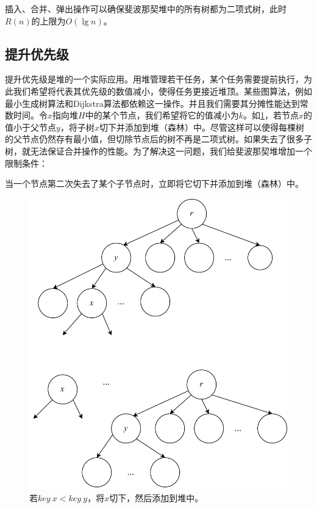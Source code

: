 \documentclass[b5paper]{ctexart}
\begin{document}
插入、合并、弹出操作可以确保斐波那契堆中的所有树都为二项式树，此时$R(n)$的上限为$O(\lg n)$。

\subsection{提升优先级}

提升优先级是堆的一个实际应用。用堆管理若干任务，某个任务需要提前执行，为此我们希望将代表其优先级的数值减小，使得任务更接近堆顶。某些图算法，例如最小生成树算法和Dijkstra算法都依赖这一操作\cite{CLRS}。并且我们需要其分摊性能达到常数时间。令$x$指向堆$H$中的某个节点，我们希望将它的值减小为$k$。如\cref{fig:cut-fib-tree}，若节点$x$的值小于父节点$y$，将子树$x$切下并添加到堆（森林）中。尽管这样可以使得每棵树的父节点仍然存有最小值，但切除节点后的树不再是二项式树。如果失去了很多子树，就无法保证合并操作的性能。为了解决这一问题，我们给斐波那契堆增加一个限制条件：

\begin{center}当一个节点第二次失去了某个子节点时，立即将它切下并添加到堆（森林）中。
\end{center}

\begin{figure}[htbp]
  \centering
  \includegraphics[scale=0.5]{img/fib-cut-past}
  \caption{若$key\ x < key\ y$，将$x$切下，然后添加到堆中。}
  \label{fig:cut-fib-tree}
\end{figure}
\end{document}
